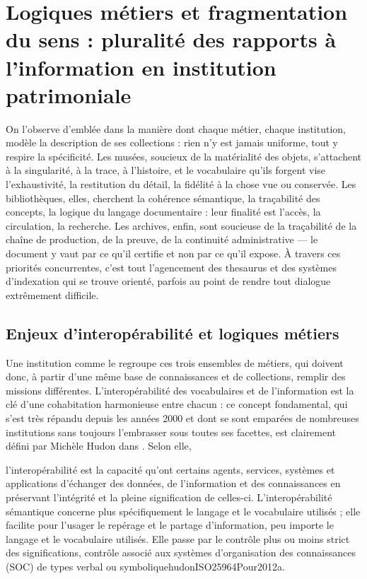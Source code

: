 \section{\label{II-B-2}Logiques métiers et fragmentation du sens : pluralité des rapports à l’information en institution patrimoniale}

On l’observe d’emblée dans la manière dont chaque métier, chaque institution, modèle la description de ses collections : rien n’y est jamais uniforme, tout y respire la spécificité. Les musées, soucieux de la matérialité des objets, s’attachent à la singularité, à la trace, à l’histoire, et le vocabulaire qu’ils forgent vise l’exhaustivité, la restitution du détail, la fidélité à la chose vue ou conservée. Les bibliothèques, elles, cherchent la cohérence sémantique, la traçabilité des concepts, la logique du langage documentaire : leur finalité est l’accès, la circulation, la recherche. Les archives, enfin, sont soucieuse de la traçabilité de la chaîne de production, de la preuve, de la continuité administrative — le document y vaut par ce qu’il certifie et non par ce qu’il expose. À travers ces priorités concurrentes, c’est tout l’agencement des \gls{thesaurus} et des systèmes d’indexation qui se trouve orienté, parfois au point de rendre tout dialogue extrêmement difficile.

\subsection{Enjeux d’interopérabilité et logiques métiers}

Une institution comme le \mae regroupe ces trois ensembles de métiers, qui doivent donc, à partir d'une même base de connaissances et de collections, remplir des missions différentes. L’interopérabilité des vocabulaires et de l'information est la clé d'une cohabitation harmonieuse entre chacun : ce concept fondamental, qui s'est très répandu depuis les années 2000 et dont se sont emparées de nombreuses institutions sans toujours l'embrasser sous toutes ses facettes, est clairement défini par Michèle Hudon dans . Selon elle, 
\begin{myquote}
	{l’interopérabilité est la capacité qu’ont certains agents, services, systèmes et applications d’échanger des données, de l’information et des connaissances en préservant l’intégrité et la pleine signification de celles-ci. L’interopérabilité sémantique concerne plus spécifiquement le langage et le vocabulaire utilisés \textelp{} ; elle facilite pour l’usager le repérage et le partage d’information, peu importe le langage et le vocabulaire utilisés. \textelp{} Elle passe par le contrôle plus ou moins strict des significations, contrôle associé aux systèmes d’organisation des connaissances (SOC) de types verbal ou symbolique}{hudonISO25964Pour2012a}.
\end{myquote}

